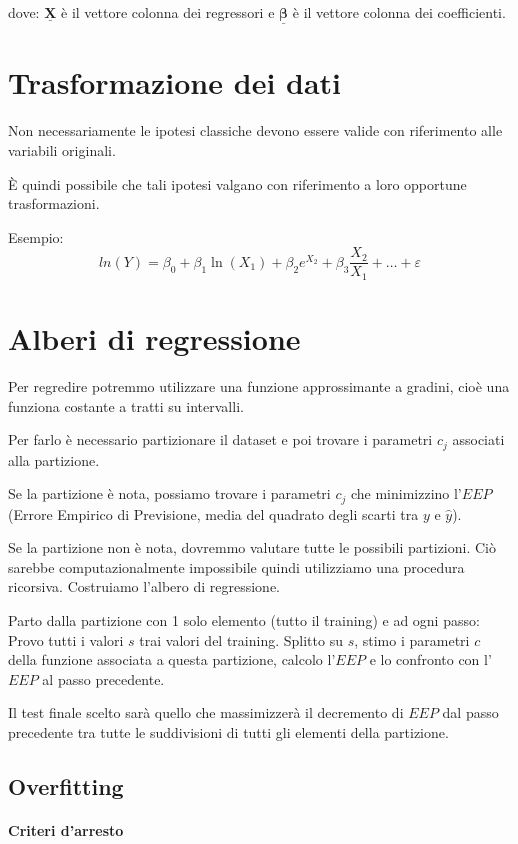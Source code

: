 \documentclass[11pt,onecolumn,a4paper,oneside]{book}
\begin{document}
dove:
$\underline{\mathbf{X}}$ è il vettore colonna dei regressori e $\underline{\mathbf{\beta}}$ è il vettore colonna dei coefficienti.

\section{Trasformazione dei dati}
Non necessariamente le ipotesi classiche devono essere valide con riferimento alle variabili originali.

È quindi possibile che tali ipotesi valgano con riferimento a loro opportune trasformazioni.

Esempio:
$$ln(Y) = \beta_0 + \beta_1 \ln (X_1) + \beta_2 e^{X_2} + \beta_3 \frac{X_2}{X_1}+\dots + \varepsilon$$

\section{Alberi di regressione}
Per regredire potremmo utilizzare una funzione approssimante a gradini, cioè una funziona costante a tratti su intervalli.

Per farlo è necessario partizionare il dataset e poi trovare i parametri $c_j$ associati alla partizione.

Se la partizione è nota, possiamo trovare i parametri $c_j$ che minimizzino l'$EEP$ (Errore Empirico di Previsione, media del quadrato degli scarti tra $y$ e $\hat y$).

Se la partizione non è nota, dovremmo valutare tutte le possibili partizioni. Ciò sarebbe computazionalmente impossibile quindi utilizziamo una procedura ricorsiva. Costruiamo l'albero di regressione.

Parto dalla partizione con 1 solo elemento (tutto il training) e ad ogni passo:
Provo tutti i valori $s$ trai valori del training.
Splitto su $s$, stimo i parametri $c$ della funzione associata a questa partizione, calcolo l'$EEP$ e lo confronto con l'$EEP$ al passo precedente.

Il test finale scelto sarà quello che massimizzerà il decremento di $EEP$ dal passo precedente tra tutte le suddivisioni di tutti gli elementi della partizione.

\subsection{Overfitting}

\paragraph{Criteri d'arresto}
\end{document}
